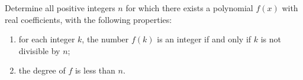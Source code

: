 Determine all positive integers $n$ for which there exists a polynomial $f(x)$ with real coefficients, with the following properties:
\begin{enumerate}[label=(\arabic*)]
	\item for each integer $k$, the number $f(k)$ is an integer if and only if $k$ is not divisible by $n$;
	\item the degree of $f$ is less than $n$.
\end{enumerate}
